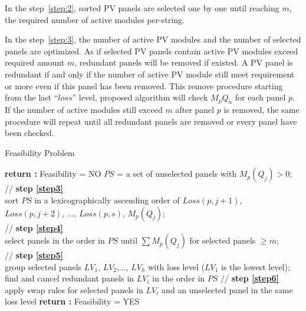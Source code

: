 \documentclass[journal]{IEEEtran}
\begin{document}
In the step~\ref{step:2}, sorted PV panels are selected one by one until reaching $m$, the required number of active modules per-string.

In the step~\ref{step:3}, the number of active PV modules and the number of selected panels are optimized.
As if selected PV panels contain active PV modules exceed required amount $m$, redundant panels will be removed if existed.
A PV panel is redundant if and only if the number of active PV module still meet requirement or more even if this panel has been removed.
This remove procedure starting from the last ``$loss$'' level, proposed algorithm will check $M_{p}Q_{n}$ for each panel $p$.
If the number of active modules still exceed $m$ after panel $p$ is removed, the same procedure will repeat until all redundant panels are removed or every panel have been checked.


\begin{algorithm}[htbp]
  \caption{Feasibility Problem}
  \label{sec:algorithm-1}
  \LinesNumbered
  {{
      {\textup{\textbf{return :}} Feasibility = NO}}
    $PS$ = a set of unselected panels with $M_{p}(Q_{j}) > 0$;\\
     // \textbf{step \ref{step3}}\\
     sort $PS$ in a lexicographically ascending order of $Loss(p,j+1)$, $Loss(p,j+2)$, $\ldots$, $Loss(p,s)$, $M_{p}(Q_{j})$;\\
     // \textbf{step \ref{step4}}\\
     select panels in the order in $PS$ until $\sum M_{p}(Q_{j})$ for selected panels $\geq m$;\\
     // \textbf{step \ref{step5}}\\
     group selected panels $LV_{1}$, $LV_{2}$,$\ldots$, $LV_{h}$ with loss level ($LV_{1}$ is the lowest level);\\
     {find and cancel redundant panels in $LV_{i}$ in the order in $PS$}
     // \textbf{step \ref{step6}}\\
     {apply swap rules for selected panels in $LV_{i}$ and an unselected panel in the same loss level}
    }
    \textup{\textbf{return :}} Feasibility = YES
  \end{algorithm}
\end{document}
